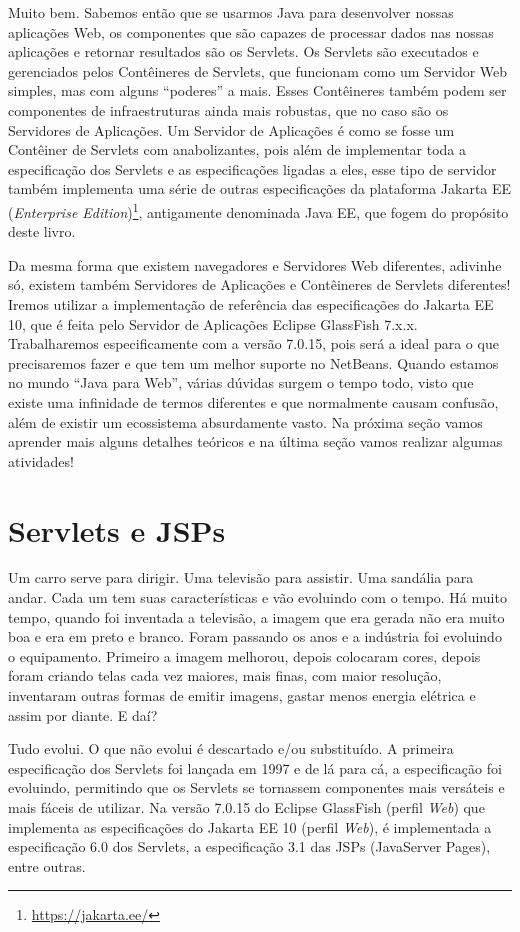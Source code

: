 Muito bem. Sabemos então que se usarmos Java para desenvolver nossas aplicações Web, os componentes que são capazes de processar dados nas nossas aplicações e retornar resultados são os Servlets. Os Servlets são executados e gerenciados pelos Contêineres de Servlets, que funcionam como um Servidor Web simples, mas com alguns ``poderes'' a mais. Esses Contêineres também podem ser componentes de infraestruturas ainda mais robustas, que no caso são os Servidores de Aplicações. Um Servidor de Aplicações é como se fosse um Contêiner de Servlets com anabolizantes, pois além de implementar toda a especificação dos Servlets e as especificações ligadas a eles, esse tipo de servidor também implementa uma série de outras especificações da plataforma Jakarta EE (\textit{Enterprise Edition})\footnote{\url{https://jakarta.ee/}}, antigamente denominada Java EE, que fogem do propósito deste livro.

Da mesma forma que existem navegadores e Servidores Web diferentes, adivinhe só, existem também Servidores de Aplicações e Contêineres de Servlets diferentes! Iremos utilizar a implementação de referência das especificações do Jakarta EE 10, que é feita pelo Servidor de Aplicações Eclipse GlassFish 7.x.x. Trabalharemos especificamente com a versão 7.0.15, pois será a ideal para o que precisaremos fazer e que tem um melhor suporte no NetBeans. Quando estamos no mundo ``Java para Web'', várias dúvidas surgem o tempo todo, visto que existe uma infinidade de termos diferentes e que normalmente causam confusão, além de existir um ecossistema absurdamente vasto. Na próxima seção vamos aprender mais alguns detalhes teóricos e na última seção vamos realizar algumas atividades!


\section{Servlets e JSPs}

Um carro serve para dirigir. Uma televisão para assistir. Uma sandália para andar. Cada um tem suas características e vão evoluindo com o tempo. Há muito tempo, quando foi inventada a televisão, a imagem que era gerada não era muito boa e era em preto e branco. Foram passando os anos e a indústria foi evoluindo o equipamento. Primeiro a imagem melhorou, depois colocaram cores, depois foram criando telas cada vez maiores, mais finas, com maior resolução, inventaram outras formas de emitir imagens, gastar menos energia elétrica e assim por diante. E daí?

Tudo evolui. O que não evolui é descartado e/ou substituído. A primeira especificação dos Servlets foi lançada em 1997 e de lá para cá, a especificação foi evoluindo, permitindo que os Servlets se tornassem componentes mais versáteis e mais fáceis de utilizar. Na versão 7.0.15 do Eclipse GlassFish (perfil \textit{Web}) que implementa as especificações do Jakarta EE 10 (perfil \textit{Web}), é implementada a especificação 6.0 dos Servlets, a especificação 3.1 das JSPs (JavaServer Pages), entre outras.

